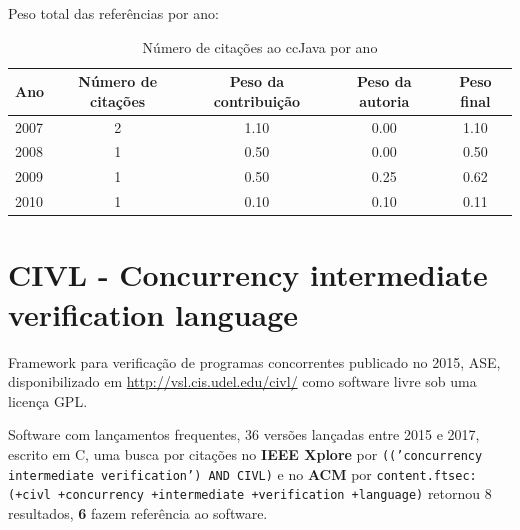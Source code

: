 Peso total das referências por ano:

\begin{table}[h]
\caption{Número de citações ao ccJava  por ano}
\centering
\begin{tabular}{| l | c | c | c | c |}
  \hline
  Ano & Número de citações & Peso da contribuição & Peso da autoria & Peso final \\
  \hline
  2007
    & 2
    & 1.10
    & 0.00
    & 1.10 \\
  2008
    & 1
    & 0.50
    & 0.00
    & 0.50 \\
  2009
    & 1
    & 0.50
    & 0.25
    & 0.62 \\
  2010
    & 1
    & 0.10
    & 0.10
    & 0.11 \\
  \hline
\end{tabular}
\end{table}


\section{CIVL - Concurrency intermediate verification language}

Framework para verificação de programas concorrentes
publicado no 2015, ASE,
disponibilizado em \url{http://vsl.cis.udel.edu/civl/}
como software livre
sob uma licença GPL.

Software com lançamentos frequentes,
36 versões lançadas
entre 2015 e 2017,
escrito em C,
uma busca por citações no {\bf IEEE Xplore} por
\texttt{(('concurrency intermediate verification') AND CIVL)}
e no {\bf ACM} por
\texttt{content.ftsec:(+civl +concurrency +intermediate +verification +language)}
retornou
8 resultados,
{\bf 6} fazem referência ao software.

